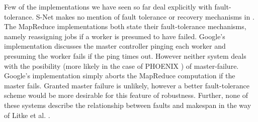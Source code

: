 Few of the implementations we have seen so far deal explicitly with fault-tolerance.
S-Net makes no mention of fault tolerance or recovery mechanisms in \cite{pen09}.
The MapReduce implementations \cite{dea08, ran07} both state their fault-tolerance mechanisms, namely reassigning jobs if a worker is presumed to have failed.
Google's implementation discusses the master controller pinging each worker and presuming the worker fails if the ping times out.
However neither system deals with the posibility (more likely in the case of PHOENIX \cite{ran07}) of master-failure.
Google's implementation simply aborts the MapReduce computation if the master fails.
Granted master failure is unlikely, however a better fault-tolerance scheme would be more desirable for this feature of robustness.
Further, none of these systems describe the relationship between faults and makespan in the way of Litke et al. \cite{lit07}.